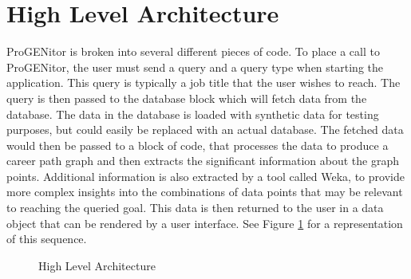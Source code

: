\section{High Level Architecture}
\label{sect:high-level-architecture}
ProGENitor is broken into several different pieces of code.  To place a call
to ProGENitor, the user must send a query and a query type when starting the
application.  This query is typically a job title that the user wishes to reach.
The query is then passed to the database block which will fetch data from the
database.  The data in the database is loaded with synthetic data for testing
purposes, but could easily be replaced with an actual database. The fetched data
would then be passed to a block of code, that processes the data to produce a
career path graph and then extracts the significant information about the graph
points.  Additional information is also extracted by a tool called Weka, to
provide more complex insights into the combinations of data points that may be
relevant to reaching the queried goal.  This data is then returned to the user
in a data object that can be rendered by a user interface.  See Figure \ref{fig:HighLevelProjectArchitecture}
for a representation of this sequence.

\usetikzlibrary{shapes,arrows,chains}

\begin{figure}[H]
	\centering
  

	\caption{High Level Architecture}
	\label{fig:HighLevelProjectArchitecture}
\end{figure}

